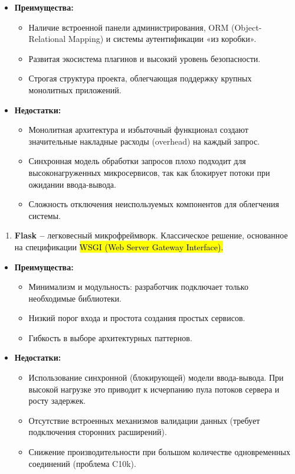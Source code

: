 \documentclass[
]{article}
\begin{document}
\begin{itemize}
\item
  \textbf{Преимущества:}

  \begin{itemize}
  \item
    Наличие встроенной панели администрирования, ORM (Object-Relational
    Mapping) и системы аутентификации «из коробки».
  \item
    Развитая экосистема плагинов и высокий уровень безопасности.
  \item
    Строгая структура проекта, облегчающая поддержку крупных монолитных
    приложений.
  \end{itemize}
\item
  \textbf{Недостатки:}

  \begin{itemize}
  \item
    Монолитная архитектура и избыточный функционал создают значительные
    накладные расходы (overhead) на каждый запрос.
  \item
    Синхронная модель обработки запросов плохо подходит для
    высоконагруженных микросервисов, так как блокирует потоки при
    ожидании ввода-вывода.
  \item
    Сложность отключения неиспользуемых компонентов для облегчения
    системы.
  \end{itemize}
\end{itemize}

\begin{enumerate}
\def\labelenumi{\arabic{enumi}.}
\setcounter{enumi}{1}
\item
  \textbf{Flask --} легковесный микрофреймворк. Классическое решение,
  основанное на спецификации \hl{WSGI (Web Server Gateway Interface).}
\end{enumerate}

\begin{itemize}
\item
  \textbf{Преимущества:}

  \begin{itemize}
  \item
    Минимализм и модульность: разработчик подключает только необходимые
    библиотеки.
  \item
    Низкий порог входа и простота создания простых сервисов.
  \item
    Гибкость в выборе архитектурных паттернов.
  \end{itemize}
\item
  \textbf{Недостатки:}

  \begin{itemize}
  \item
    Использование синхронной (блокирующей) модели ввода-вывода. При
    высокой нагрузке это приводит к исчерпанию пула потоков сервера и
    росту задержек.
  \item
    Отсутствие встроенных механизмов валидации данных (требует
    подключения сторонних расширений).
  \item
    Снижение производительности при большом количестве одновременных
    соединений (проблема C10k).
  \end{itemize}
\end{itemize}
\end{document}
